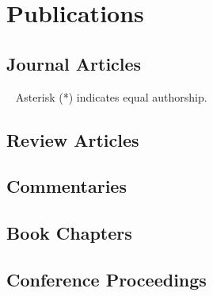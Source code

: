 \documentclass[%
]{komacv}
\begin{document}
\section{Publications}

\subsection{Journal Articles}
~
{\small Asterisk (*) indicates equal authorship.}

\begin{refcontext}[]
\nocite{*}
\printbibliography[, keyword=article, heading=none, resetnumbers=true]
\end{refcontext}

\subsection{Review Articles}

\begin{refcontext}[]
\nocite{*}
\printbibliography[, keyword=review, heading=none, resetnumbers=true]
\end{refcontext}

\subsection{Commentaries}

\begin{refcontext}[]
\nocite{*}
\printbibliography[, keyword=commentary, heading=none, resetnumbers=true]
\end{refcontext}

\subsection{Book Chapters}

\begin{refcontext}[]
\nocite{*}
\printbibliography[keyword=book, heading=none, resetnumbers=true]
\end{refcontext}

\subsection{Conference Proceedings}

\begin{refcontext}[]
\nocite{*}
\printbibliography[keyword=proceeding, heading=none, resetnumbers=true]
\end{refcontext}
\end{document}
